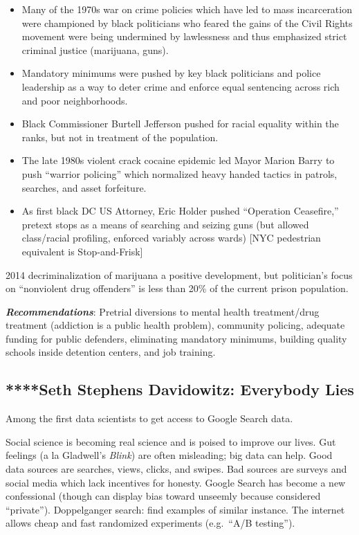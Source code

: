 \documentclass[
]{article}
\begin{document}
\begin{itemize}
\item
  Many of the 1970s war on crime policies which have led to mass
  incarceration were championed by black politicians who feared the
  gains of the Civil Rights movement were being undermined by
  lawlessness and thus emphasized strict criminal justice (marijuana,
  guns).
\item
  Mandatory minimums were pushed by key black politicians and police
  leadership as a way to deter crime and enforce equal sentencing across
  rich and poor neighborhoods.
\item
  Black Commissioner Burtell Jefferson pushed for racial equality within
  the ranks, but not in treatment of the population.
\item
  The late 1980s violent crack cocaine epidemic led Mayor Marion Barry
  to push ``warrior policing'' which normalized heavy handed tactics in
  patrols, searches, and asset forfeiture.
\item
  As first black DC US Attorney, Eric Holder pushed ``Operation
  Ceasefire,'' pretext stops as a means of searching and seizing guns
  (but allowed class/racial profiling, enforced variably across wards)
  {[}NYC pedestrian equivalent is Stop-and-Frisk{]}
\end{itemize}

2014 decriminalization of marijuana a positive development, but
politician's focus on ``nonviolent drug offenders'' is less than 20\% of
the current prison population.

\textbf{\emph{Recommendations}}: Pretrial diversions to mental health
treatment/drug treatment (addiction is a public health problem),
community policing, adequate funding for public defenders, eliminating
mandatory minimums, building quality schools inside detention centers,
and job training.

\hypertarget{seth-stephens-davidowitz-everybody-lies}{%
\subsection{****Seth Stephens Davidowitz: Everybody
Lies}\label{seth-stephens-davidowitz-everybody-lies}}

Among the first data scientists to get access to Google Search data.

Social science is becoming real science and is poised to improve our
lives. Gut feelings (a la Gladwell's \emph{Blink}) are often misleading;
big data can help. Good data sources are searches, views, clicks, and
swipes. Bad sources are surveys and social media which lack incentives
for honesty. Google Search has become a new confessional (though can
display bias toward unseemly because considered ``private'').
Doppelganger search: find examples of similar instance. The internet
allows cheap and fast randomized experiments (e.g.~``A/B testing'').
\end{document}

